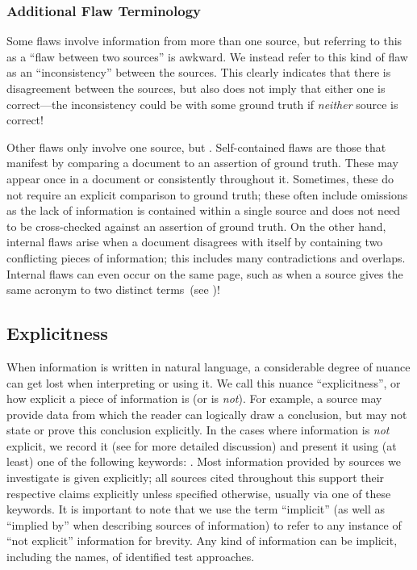 \subsubsection{Additional Flaw Terminology}\label{add-flaw-terms}
Some flaws involve information from more than one source, but referring to this
as a ``flaw between two sources'' is awkward. We instead %
refer to this kind of flaw as an ``inconsistency'' between the
sources. This clearly indicates that there is disagreement between
the sources, but also does not imply that either one is correct---the
inconsistency could be with some ground truth if \emph{neither} source is
correct! %

\label{one-src-flaws}
Other flaws only involve one source, but \oneSrcDistinct{}.
Self-contained flaws are those that manifest by comparing a document to an
assertion of ground truth. These may appear once in a document or consistently
throughout it. Sometimes, these do not require an explicit comparison to ground
truth; these often include omissions as the lack of information is
contained within a single source and does not need to be cross-checked against
an assertion of ground truth. On the other hand, internal flaws arise when a
document disagrees with itself by containing two conflicting pieces of
information; this includes many contradictions and overlaps. Internal flaws can
even occur on the same page, such as when a source gives the same acronym to
two distinct terms\ifnotpaper\ (see )\fi!

\subsection{Explicitness}\label{explicitness}

When information is written in natural language, a considerable degree of
nuance can get lost when interpreting or using it. We call this nuance
``explicitness'', or how explicit a piece of information is (or is \emph{not}).
For example, a source may provide data from which the reader can logically draw
a conclusion, but may not state or prove this conclusion explicitly. In the
cases where information is \emph{not} explicit, we record it (see
 for more detailed discussion) and present it using (at least)
one of the following keywords: \impKeywords{}. Most information provided
by sources we investigate is given explicitly; all sources cited throughout
this \docType{} support their respective claims explicitly unless specified
otherwise, usually via one of these keywords. It is important to note that we
use the term ``implicit'' (as well as ``implied by'' when describing sources of
information) to refer to any instance of ``not explicit'' information for
brevity. Any kind of information can be implicit, including the names,
\approachFields{} of identified test approaches.

